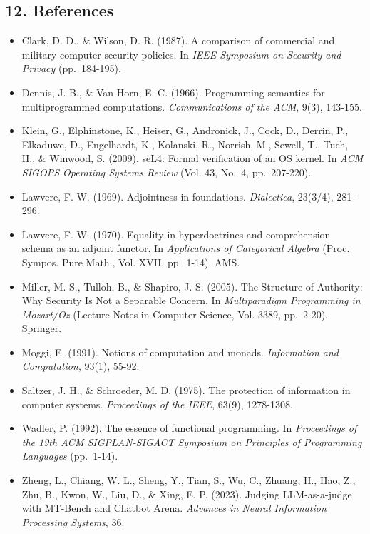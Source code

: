 \documentclass[
  10pt,
]{article}
\begin{document}
\subsection{12. References}\label{references}

\begin{itemize}
\item
  Clark, D. D., \& Wilson, D. R. (1987). A comparison of commercial and military computer security policies. In \emph{IEEE Symposium on Security and Privacy} (pp.~184-195).
\item
  Dennis, J. B., \& Van Horn, E. C. (1966). Programming semantics for multiprogrammed computations. \emph{Communications of the ACM}, 9(3), 143-155.
\item
  Klein, G., Elphinstone, K., Heiser, G., Andronick, J., Cock, D., Derrin, P., Elkaduwe, D., Engelhardt, K., Kolanski, R., Norrish, M., Sewell, T., Tuch, H., \& Winwood, S. (2009). seL4: Formal verification of an OS kernel. In \emph{ACM SIGOPS Operating Systems Review} (Vol. 43, No.~4, pp.~207-220).
\item
  Lawvere, F. W. (1969). Adjointness in foundations. \emph{Dialectica}, 23(3/4), 281-296.
\item
  Lawvere, F. W. (1970). Equality in hyperdoctrines and comprehension schema as an adjoint functor. In \emph{Applications of Categorical Algebra} (Proc. Sympos. Pure Math., Vol. XVII, pp.~1-14). AMS.
\item
  Miller, M. S., Tulloh, B., \& Shapiro, J. S. (2005). The Structure of Authority: Why Security Is Not a Separable Concern. In \emph{Multiparadigm Programming in Mozart/Oz} (Lecture Notes in Computer Science, Vol. 3389, pp.~2-20). Springer.
\item
  Moggi, E. (1991). Notions of computation and monads. \emph{Information and Computation}, 93(1), 55-92.
\item
  Saltzer, J. H., \& Schroeder, M. D. (1975). The protection of information in computer systems. \emph{Proceedings of the IEEE}, 63(9), 1278-1308.
\item
  Wadler, P. (1992). The essence of functional programming. In \emph{Proceedings of the 19th ACM SIGPLAN-SIGACT Symposium on Principles of Programming Languages} (pp.~1-14).
\item
  Zheng, L., Chiang, W. L., Sheng, Y., Tian, S., Wu, C., Zhuang, H., Hao, Z., Zhu, B., Kwon, W., Liu, D., \& Xing, E. P. (2023). Judging LLM-as-a-judge with MT-Bench and Chatbot Arena. \emph{Advances in Neural Information Processing Systems}, 36.
\end{itemize}
\end{document}

